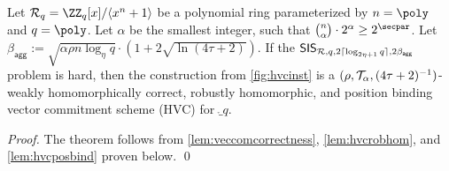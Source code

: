 \begin{theorem}\label{theo:veccom}
  Let $\ring_q=\ZZ_q[x]/\langle x^n+1\rangle$ be a polynomial ring parameterized by $n=\poly$ and $q=\poly$.
  Let $\alpha$ be the smallest integer, such that $\binom{n}{\alpha}\cdot 2^\alpha \geq 2^\secpar$.
  Let $\beta_{\mathsf{agg}} := \sqrt{\alpha\rho n\log_\eta q}\cdot(1+2\sqrt{\ln(4\tau+2)})$.
  If the $\mathsf{SIS}_{\mathcal{R},q,2\lceil \log_{2\eta+1} q \rceil,2\beta_{\mathsf{agg}}}$ problem is hard, then the construction from \autoref{fig:hvcinst} is a $(\rho,\mathcal{T}_\alpha,(4\tau+2)^{-1})$-weakly homomorphically correct, robustly homomorphic, and position binding vector commitment scheme (HVC) for $\ring_q$.
\end{theorem}
\begin{proof}
  The theorem follows from \autoref{lem:veccomcorrectness}, \autoref{lem:hvcrobhom}, and \autoref{lem:hvcposbind} proven below. \qed
\end{proof}

